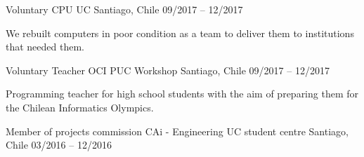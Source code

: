 \begin{cventries}
  \cventry
    {Voluntary} %
    {CPU UC} %
    {Santiago, Chile} %
    {09/2017 – 12/2017} %
    {
      \begin{cvitems} %
        \item {We rebuilt computers in poor condition as a team to deliver them to institutions that needed them.}
      \end{cvitems}
    }

  \cventry
    {Voluntary Teacher} %
    {OCI PUC Workshop} %
    {Santiago, Chile} %
    {09/2017 – 12/2017} %
    {
      \begin{cvitems} %
        \item {Programming teacher for high school students with the aim of preparing them for the Chilean Informatics Olympics.}
      \end{cvitems}
    }

\cventry
  {Member of projects commission} %
  {CAi - Engineering UC student centre} %
  {Santiago, Chile} %
  {03/2016 – 12/2016} %
  {}

\end{cventries}
